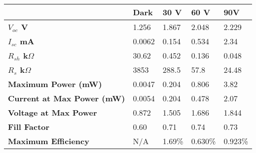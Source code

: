 \begin{tabular}{lllll}
                                   & \textbf{Dark} & \textbf{30 V} & \textbf{60 V} & \textbf{90V} \\ \hline
\textbf{$V_{oc}$ V}                & 1.256         & 1.867         & 2.048         & 2.229        \\
\textbf{$I_{sc}$ mA}               & 0.0062        & 0.154         & 0.534         & 2.34         \\
\textbf{$R_{sh}$ k$\Omega$}        & 30.62         & 0.452         & 0.136         & 0.048        \\
\textbf{$R_{s}$ k$\Omega$}         & 3853          & 288.5         & 57.8          & 24.48        \\ \hline
\textbf{Maximum Power (mW)}        & 0.0047        & 0.204         & 0.806         & 3.82         \\
\textbf{Current at Max Power (mW)} & 0.0054        & 0.204         & 0.478         & 2.07         \\
\textbf{Voltage at Max Power}      & 0.872         & 1.505         & 1.686         & 1.844        \\ \hline
\textbf{Fill Factor}               & 0.60          & 0.71          & 0.74          & 0.73         \\
\textbf{Maximum Efficiency}        & N/A           & 1.69\%        & 0.630\%       & 0.923\%      \\ \hline
\end{tabular}